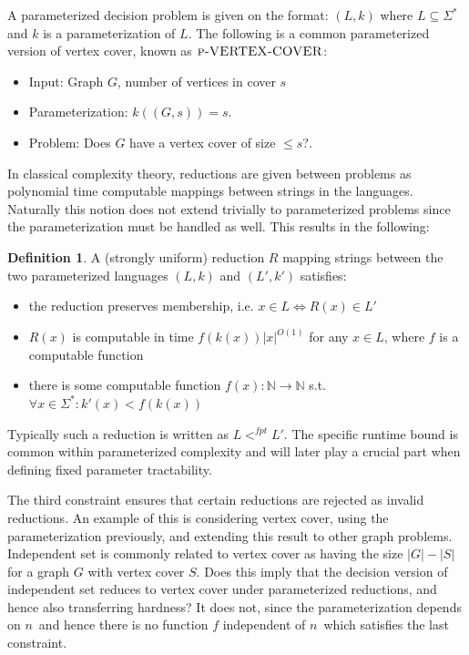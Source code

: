 \documentclass[a4paper,11pt]{report}
\theoremstyle{plain}
\theoremstyle{definition}
\newtheorem{defn}[thm]{Definition} %
\begin{document}
A parameterized decision problem is given on the format: $(L, k)$ where $L \subseteq \Sigma^*$ and $k$ is a parameterization of $L$.
The following is a common parameterized version of vertex cover, known as $\textsc{p-VERTEX-COVER}$:
\begin{itemize}
\item Input: Graph $G$, number of vertices in cover $s$
\item Parameterization: $k((G, s)) = s$.
\item Problem: Does $G$ have a vertex cover of size $\leq s$?.
\end{itemize}

In classical complexity theory, reductions are given between problems as polynomial time computable mappings between strings in the languages.
Naturally this notion does not extend trivially to parameterized problems since the parameterization must be handled as well.
This results in the following:

\begin{defn}
A (strongly uniform) reduction $R$ mapping strings between the two parameterized languages $(L, k)$ and $(L', k')$ satisfies:
\begin{itemize}
\item the reduction preserves membership, i.e. $x \in L \Leftrightarrow R(x) \in L'$
\item $R(x)$ is computable in time $f(k(x)) |x|^{O(1)}$ for any $x \in L$, where $f$ is a computable function
\item there is some computable function $f(x) : \mathbb{N} \rightarrow \mathbb{N}$ s.t. $\forall x \in \Sigma^* : k'(x) < f(k(x))$
\end{itemize}
\end{defn}

Typically such a reduction is written as $L <^{fpt} L'$.
The specific runtime bound is common within parameterized complexity and will later play a crucial part when defining fixed parameter tractability.

The third constraint ensures that certain reductions are rejected as invalid reductions.
An example of this is considering vertex cover, using the parameterization previously, and extending this result to other graph problems.
Independent set is commonly related to vertex cover as having the size $|G| - |S|$ for a graph $G$ with vertex cover $S$.
Does this imply that the decision version of independent set reduces to vertex cover under parameterized reductions, and hence also transferring hardness?
It does not, since the parameterization depends on $n$ and hence there is no function $f$ independent of $n$ which satisfies the last constraint.
\end{document}
